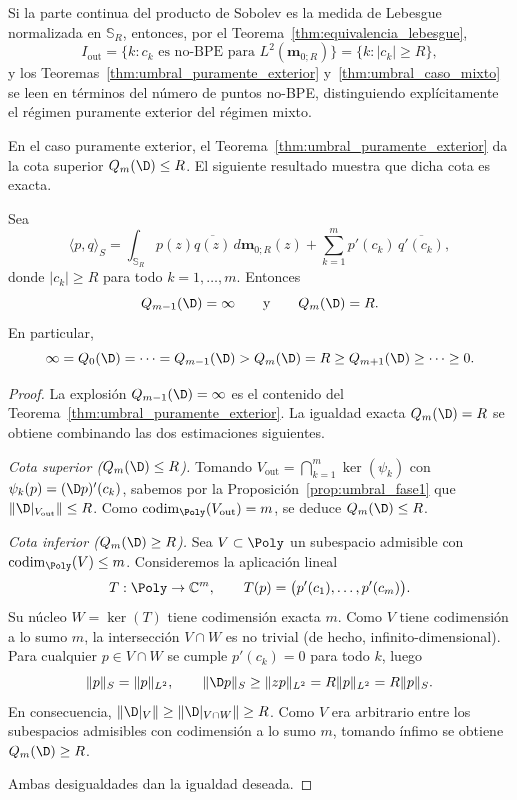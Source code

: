 \begin{cor}\label{cor:lectura_BPE_lebesgue}
	Si la parte continua del producto de Sobolev es la medida de Lebesgue
	normalizada en $\mathbb{S}_R$, entonces, por el
	Teorema~\ref{thm:equivalencia_lebesgue},
	\[
		I_{\mathrm{out}}=\{k:c_k\text{ es no-BPE para }L^2(\mathbf m_{0;R})\}
		=\{k:|c_k|\ge R\},
	\]
	y los Teoremas~\ref{thm:umbral_puramente_exterior} y~\ref{thm:umbral_caso_mixto}
	se leen en términos del número de puntos no-BPE, distinguiendo explícitamente
	el régimen puramente exterior del régimen mixto.
\end{cor}

En el caso puramente exterior, el Teorema~\ref{thm:umbral_puramente_exterior} da la cota superior $Q_m(\D)\le R$. El siguiente resultado muestra que dicha cota es exacta.

\begin{thm}\label{thm:exactitud_Qm_R}
	Sea
	\[
		\langle p,q\rangle_S
		=
		\int_{\mathbb{S}_R} p(z)\overline{q(z)}\,d\mathbf{m}_{0;R}(z)
		+
		\sum_{k=1}^{m} p'(c_k)\,\overline{q'(c_k)},
	\]
	donde $|c_k|\ge R$ para todo $k=1,\dots,m$. Entonces
	\[
		Q_{m-1}(\D)=\infty
		\qquad\text{y}\qquad
		Q_m(\D)=R.
	\]
	En particular,
	\[
		\infty=Q_0(\D)=\dots=Q_{m-1}(\D)>Q_m(\D)=R\ge Q_{m+1}(\D)\ge\dots\ge0.
	\]
\end{thm}

\begin{proof}
	La explosión $Q_{m-1}(\D)=\infty$ es el contenido del Teorema~\ref{thm:umbral_puramente_exterior}. La igualdad exacta $Q_m(\D)=R$ se obtiene combinando las dos estimaciones siguientes.

	\emph{Cota superior ($Q_m(\D)\le R$).} Tomando $V_{\mathrm{out}}=\bigcap_{k=1}^m\ker(\psi_k)$ con $\psi_k(p)=(\D p)'(c_k)$, sabemos por la Proposición~\ref{prop:umbral_fase1} que $\|\D|_{V_{\mathrm{out}}}\|\le R$. Como $\operatorname{codim}_{\Poly}(V_{\mathrm{out}})=m$, se deduce $Q_m(\D)\le R$.

	\emph{Cota inferior ($Q_m(\D)\ge R$).} Sea $V\subset\Poly$ un subespacio admisible con $\operatorname{codim}_{\Poly}(V)\le m$. Consideremos la aplicación lineal
	\[
		T:\Poly\to\mathbb C^m,\qquad T(p)=\bigl(p'(c_1),\dots,p'(c_m)\bigr).
	\]
	Su núcleo $W=\ker(T)$ tiene codimensión exacta $m$. Como $V$ tiene codimensión a lo sumo $m$, la intersección $V\cap W$ es no trivial (de hecho, infinito-dimensional). Para cualquier $p\in V\cap W$ se cumple $p'(c_k)=0$ para todo $k$, luego
	\[
		\|p\|_S=\|p\|_{L^2},
		\qquad
		\|\D p\|_S\ge\|zp\|_{L^2}=R\|p\|_{L^2}=R\|p\|_S.
	\]
	En consecuencia, $\|\D|_V\|\ge\|\D|_{V\cap W}\|\ge R$. Como $V$ era arbitrario entre los subespacios admisibles con codimensión a lo sumo $m$, tomando ínfimo se obtiene $Q_m(\D)\ge R$.

	Ambas desigualdades dan la igualdad deseada.
\end{proof}

